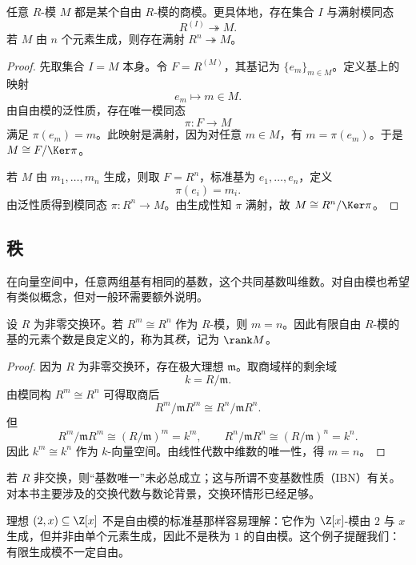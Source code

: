 \begin{theorem}
任意 $R$-模 $M$ 都是某个自由 $R$-模的商模。更具体地，存在集合 $I$ 与满射模同态
\[
R^{(I)}\twoheadrightarrow M.
\]
若 $M$ 由 $n$ 个元素生成，则存在满射 $R^n\twoheadrightarrow M$。
\end{theorem}

\begin{proof}
先取集合 $I=M$ 本身。令 $F=R^{(M)}$，其基记为 $\{e_m\}_{m\in M}$。定义基上的映射
\[
e_m\longmapsto m\in M.
\]
由自由模的泛性质，存在唯一模同态
\[
\pi\colon F\to M
\]
满足 $\pi(e_m)=m$。此映射是满射，因为对任意 $m\in M$，有 $m=\pi(e_m)$。于是 $M\cong F/\Ker\pi$。

若 $M$ 由 $m_1,\dots,m_n$ 生成，则取 $F=R^n$，标准基为 $e_1,\dots,e_n$，定义
\[
\pi(e_i)=m_i.
\]
由泛性质得到模同态 $\pi\colon R^n\to M$。由生成性知 $\pi$ 满射，故 $M\cong R^n/\Ker\pi$。
\end{proof}

\subsection{秩}

在向量空间中，任意两组基有相同的基数，这个共同基数叫维数。对自由模也希望有类似概念，但对一般环需要额外说明。

\begin{theorem}[交换环上自由模的秩良定义]
设 $R$ 为非零交换环。若 $R^m\cong R^n$ 作为 $R$-模，则 $m=n$。因此有限自由 $R$-模的基的元素个数是良定义的，称为其\emph{秩}，记为 $\rank M$。
\end{theorem}

\begin{proof}
因为 $R$ 为非零交换环，存在极大理想 $\mathfrak m$。取商域样的剩余域
\[
k=R/\mathfrak m.
\]
由模同构 $R^m\cong R^n$ 可得取商后
\[
R^m/\mathfrak m R^m\cong R^n/\mathfrak m R^n.
\]
但
\[
R^m/\mathfrak m R^m\cong (R/\mathfrak m)^m=k^m,
\qquad
R^n/\mathfrak m R^n\cong (R/\mathfrak m)^n=k^n.
\]
因此 $k^m\cong k^n$ 作为 $k$-向量空间。由线性代数中维数的唯一性，得 $m=n$。
\end{proof}

\begin{remark}
若 $R$ 非交换，则“基数唯一”未必总成立；这与所谓不变基数性质（IBN）有关。对本书主要涉及的交换代数与数论背景，交换环情形已经足够。
\end{remark}

\begin{example}
理想 $(2,x)\subseteq \Z[x]$ 不是自由模的标准基那样容易理解：它作为 $\Z[x]$-模由 $2$ 与 $x$ 生成，但并非由单个元素生成，因此不是秩为 $1$ 的自由模。这个例子提醒我们：有限生成模不一定自由。
\end{example}

